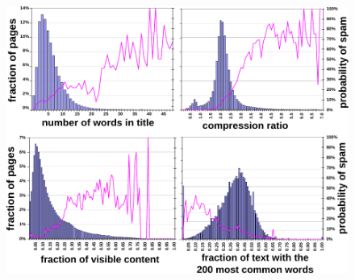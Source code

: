 \begin{frame}[plain]
\begin{figure}
\centering


 	\includegraphics[width=\textwidth]{img/webspam-all.pdf}
\end{figure}
\end{frame}

